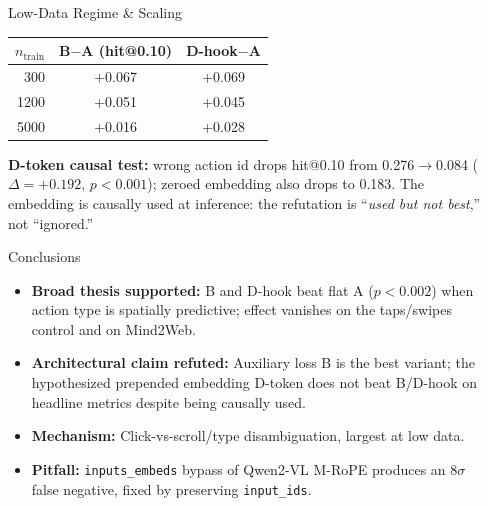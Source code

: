 \documentclass[final]{beamer}
\newlength{\sepwidth}
\newlength{\colwidth}
\newcommand{\separatorcolumn}{\begin{column}{\sepwidth}\end{column}}
\begin{document}
\begin{frame}[t]
\begin{columns}[t]
\begin{column}{\colwidth}
\begin{block}{Low-Data Regime \& Scaling}
    \begin{tabular}{@{}rcc@{}}
      \toprule
      $n_\text{train}$ & B$-$A (hit@0.10) & D-hook$-$A \\
      \midrule
      300  & +0.067 & +0.069 \\
      1200 & +0.051 & +0.045 \\
      5000 & +0.016 & +0.028 \\
      \bottomrule
    \end{tabular}

    \textbf{D-token causal test:} wrong action id drops hit@0.10 from 0.276$\to$0.084 ($\Delta{=}{+}0.192$, $p{<}0.001$); zeroed embedding also drops to 0.183. The embedding is causally used at inference: the refutation is ``\emph{used but not best},'' not ``ignored.''
  \end{block}

  \begin{alertblock}{Conclusions}
    \vspace{0.4em}
    \begin{itemize}[itemsep=7pt, topsep=0pt]
      \item \textbf{Broad thesis supported:} B and D-hook beat flat A ($p{<}0.002$) when action type is spatially predictive; effect vanishes on the taps/swipes control and on Mind2Web.
      \item \textbf{Architectural claim refuted:} Auxiliary loss B is the best variant; the hypothesized prepended embedding D-token does not beat B/D-hook on headline metrics despite being causally used.
      \item \textbf{Mechanism:} Click-vs-scroll/type disambiguation, largest at low data.
      \item \textbf{Pitfall:} \texttt{inputs\_embeds} bypass of Qwen2-VL M-RoPE produces an $8\sigma$ false negative, fixed by preserving \texttt{input\_ids}.
    \end{itemize}
  \end{alertblock}

\end{column}
\separatorcolumn
\end{columns}
\end{frame}
\end{document}
